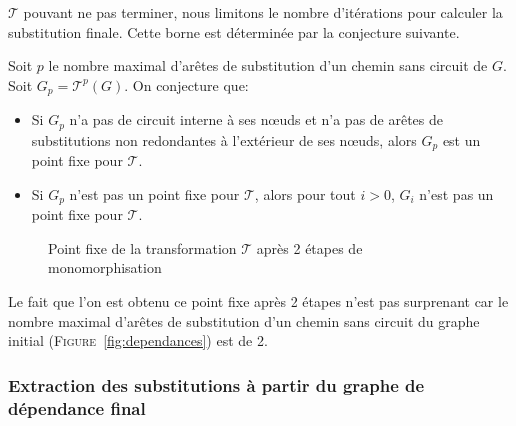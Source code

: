 $\mathcal{T}$ pouvant ne pas terminer, nous limitons le nombre
d'itérations pour calculer la substitution finale. Cette borne est
déterminée par la conjecture suivante.

\begin{conjecture}
Soit $p$ le nombre maximal d'arêtes de substitution d'un chemin sans circuit de $G$. \\Soit $G_p = \mathcal{T}^p(G)$. On conjecture que:
\begin{itemize}
\item Si $G_p$ n'a pas de circuit interne à ses nœuds et n'a pas de arêtes de substitutions non redondantes à l'extérieur de ses nœuds, alors $G_p$ est un point fixe pour $\mathcal{T}$.
\item Si $G_p$ n'est pas un point fixe pour $\mathcal{T}$, alors pour tout $i>0$, $G_i$ n'est pas un point fixe pour $\mathcal{T}$.
\end{itemize}
\end{conjecture}

\begin{figure}[h!]
\begin{center}
\end{center}
\caption{Point fixe de la transformation $\mathcal{T}$ après 2 étapes de monomorphisation}
\label{fig:point_fixe}
\end{figure}

\begin{remark}
Le fait que l'on est obtenu ce point fixe après 2 étapes n'est pas surprenant car le nombre maximal d'arêtes de substitution d'un chemin sans circuit du graphe initial (\textsc{Figure}~\ref{fig:dependances}) est de 2.
\end{remark}

\subsubsection{Extraction des substitutions à partir du graphe de
  dépendance final}

